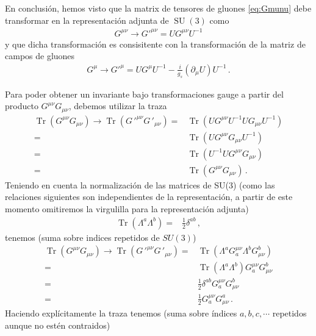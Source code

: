 \begin{frame}
En conclusión, hemos visto que la matrix de tensores de gluones \eqref{eq:Gmunu} debe transformar en la representación adjunta de $\operatorname{SU}(3)$ como
\begin{align}
\label{eq:pGmunu}
  G^{\mu\nu}\to  {G'}^{\mu\nu}=U  G^{\mu\nu} U^{-1}
\end{align}
y que dicha transformación es consisitente con la transformación de la matriz de campos de gluones
\begin{align}
  G^{\mu}\to {G'}^{\mu}= U G^{\mu} U^{-1}
-\frac{i}{g_s} \left( \partial_{\mu} U \right) U^{-1}\,.
\end{align}


Para poder obtener un invariante bajo transformaciones gauge a partir del producto $G^{\mu\nu}G_{\mu\nu}$, debemos utilizar la traza 
\begin{align}
  \operatorname{Tr}\left(G^{\mu\nu}G_{\mu\nu}\right)\to
  \operatorname{Tr}\left({G\,'}^{\mu\nu}{G\,'}_{\mu\nu}\right)
  =&\operatorname{Tr}\left(U{{G}}^{\mu\nu}U^{-1}U{{G}}_{\mu\nu}U^{-1}\right)\nonumber\\
  =&\operatorname{Tr}\left(U{{G}}^{\mu\nu}{{G}}_{\mu\nu}U^{-1}\right)\nonumber\\
  =&\operatorname{Tr}\left(U^{-1}U{{G}}^{\mu\nu}{{G}}_{\mu\nu}\right)\nonumber\\
  =&\operatorname{Tr}\left({{G}}^{\mu\nu}{{G}}_{\mu\nu}\right)\,.
\end{align}
Teniendo en cuenta la normalización de las matrices de SU(3) (como las relaciones siguientes son independientes de la representación, a partir de este momento omitiremos la virgulilla para la representación adjunta)
\begin{align}
   \operatorname{Tr}\left(\Lambda^a\Lambda^b\right)=&\frac{1}{2}\delta^{ab}\,,
\end{align}
tenemos (suma sobre indices repetidos de $SU(3)$)
\begin{align}
  \operatorname{Tr}\left(G^{\mu\nu}G_{\mu\nu}\right)\to
  \operatorname{Tr}\left({G\,'}^{\mu\nu}{G\,'}_{\mu\nu}\right)
  =&\operatorname{Tr}\left(\Lambda^a{G}^{\mu\nu}_a \Lambda^b{G}_{\mu\nu}^b\right)\nonumber\\
  =&\operatorname{Tr}\left(\Lambda^a \Lambda^b\right){G}^{\mu\nu}_a {G}_{\mu\nu}^b\nonumber\\
  =&\frac{1}{2}\delta^{a b}{G}^{\mu\nu}_a {G}_{\mu\nu}^b\nonumber\\
  =&\frac{1}{2}{G}^{\mu\nu}_a {G}_{\mu\nu}^a\,.
\end{align}
Haciendo explícitamente la traza tenemos (suma sobre índices $a,b,c,\cdots$ repetidos aunque no estén contraidos)

\end{frame}
